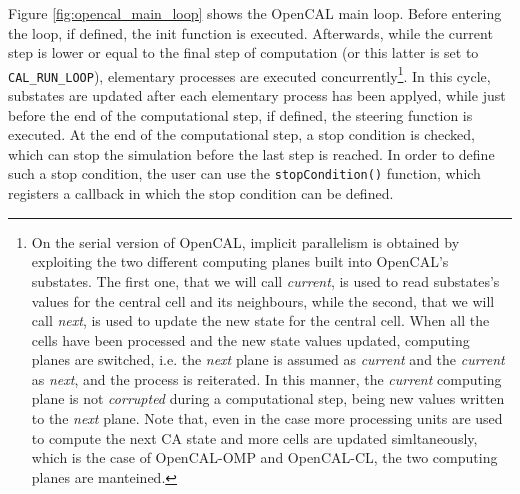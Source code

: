 Figure \ref{fig:opencal_main_loop} shows the OpenCAL main loop. Before
entering the loop, if defined, the init function is
executed. Afterwards, while the current step is lower or equal to the
final step of computation (or this latter is set to
\verb'CAL_RUN_LOOP'), elementary processes are executed
concurrently\footnote{On the serial version of OpenCAL, implicit
  parallelism is obtained by exploiting the two different computing
  planes built into OpenCAL's substates. The first one, that we will
  call \emph{current}, is used to read substates's values for the
  central cell and its neighbours, while the second, that we will call
  \emph{next}, is used to update the new state for the central
  cell. When all the cells have been processed and the new state
  values updated, computing planes are switched, i.e. the \emph{next}
  plane is assumed as \emph{current} and the \emph{current} as
  \emph{next}, and the process is reiterated. In this manner, the
  \emph{current} computing plane is not \emph{corrupted} during a
  computational step, being new values written to the \emph{next}
  plane. Note that, even in the case more processing units are used to
  compute the next CA state and more cells are updated simltaneously,
  which is the case of OpenCAL-OMP and OpenCAL-CL, the two computing
  planes are manteined.}. In this cycle, substates are updated after
each elementary process has been applyed, while just before the end of
the computational step, if defined, the steering function is
executed. At the end of the computational step, a stop condition is
checked, which can stop the simulation before the last step is
reached. In order to define such a stop condition, the user can use
the \verb'stopCondition()' function, which registers a callback in
which the stop condition can be defined.

